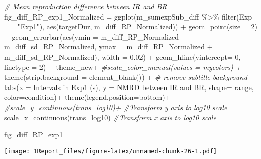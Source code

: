 \documentclass[
]{article}
\newenvironment{Shaded}{\begin{snugshade}}{\end{snugshade}}
\newcommand{\AttributeTok}[1]{\textcolor[rgb]{0.77,0.63,0.00}{#1}}
\newcommand{\CommentTok}[1]{\textcolor[rgb]{0.56,0.35,0.01}{\textit{#1}}}
\newcommand{\DecValTok}[1]{\textcolor[rgb]{0.00,0.00,0.81}{#1}}
\newcommand{\FloatTok}[1]{\textcolor[rgb]{0.00,0.00,0.81}{#1}}
\newcommand{\FunctionTok}[1]{\textcolor[rgb]{0.00,0.00,0.00}{#1}}
\newcommand{\NormalTok}[1]{#1}
\newcommand{\OtherTok}[1]{\textcolor[rgb]{0.56,0.35,0.01}{#1}}
\newcommand{\SpecialCharTok}[1]{\textcolor[rgb]{0.00,0.00,0.00}{#1}}
\newcommand{\StringTok}[1]{\textcolor[rgb]{0.31,0.60,0.02}{#1}}
\begin{document}
\begin{Shaded}
\begin{Highlighting}[]
\CommentTok{\# Mean reproduction difference between IR and BR}
\NormalTok{fig\_diff\_RP\_exp1\_Normalized }\OtherTok{=} \FunctionTok{ggplot}\NormalTok{(m\_sumexpSub\_diff }\SpecialCharTok{\%\textgreater{}\%} \FunctionTok{filter}\NormalTok{(Exp }\SpecialCharTok{==} \StringTok{"Exp1"}\NormalTok{), }\FunctionTok{aes}\NormalTok{(targetDur, m\_diff\_RP\_Normalized)) }\SpecialCharTok{+} 
  \FunctionTok{geom\_point}\NormalTok{(}\AttributeTok{size =} \DecValTok{2}\NormalTok{) }\SpecialCharTok{+}
  \FunctionTok{geom\_errorbar}\NormalTok{(}\FunctionTok{aes}\NormalTok{(}\AttributeTok{ymin =}\NormalTok{ m\_diff\_RP\_Normalized}\SpecialCharTok{{-}}\NormalTok{m\_diff\_sd\_RP\_Normalized, }\AttributeTok{ymax =}\NormalTok{ m\_diff\_RP\_Normalized }\SpecialCharTok{+}\NormalTok{ m\_diff\_sd\_RP\_Normalized), }\AttributeTok{width =} \FloatTok{0.02}\NormalTok{) }\SpecialCharTok{+} 
  \FunctionTok{geom\_hline}\NormalTok{(}\AttributeTok{yintercept=} \DecValTok{0}\NormalTok{, }\AttributeTok{linetype =} \DecValTok{2}\NormalTok{) }\SpecialCharTok{+}
\NormalTok{  theme\_new}\SpecialCharTok{+} \CommentTok{\#scale\_color\_manual(values = mycolors) +}
  \FunctionTok{theme}\NormalTok{(}\AttributeTok{strip.background =} \FunctionTok{element\_blank}\NormalTok{()) }\SpecialCharTok{+} \CommentTok{\# remove subtitle background}
  \FunctionTok{labs}\NormalTok{(}\AttributeTok{x =} \StringTok{\textquotesingle{}Intervals in Exp1 (s)\textquotesingle{}}\NormalTok{, }\AttributeTok{y =} \StringTok{\textquotesingle{}NMRD between IR and BR\textquotesingle{}}\NormalTok{, }\AttributeTok{shape=} \StringTok{\textquotesingle{}range\textquotesingle{}}\NormalTok{, }\AttributeTok{color=}\StringTok{\textquotesingle{}condition\textquotesingle{}}\NormalTok{)}\SpecialCharTok{+} 
  \FunctionTok{theme}\NormalTok{(}\AttributeTok{legend.position=}\StringTok{\textquotesingle{}bottom\textquotesingle{}}\NormalTok{)}\SpecialCharTok{+}
  \CommentTok{\#scale\_y\_continuous(trans=\textquotesingle{}log10\textquotesingle{})+ \#Transform y axis to log10 scale}
  \FunctionTok{scale\_x\_continuous}\NormalTok{(}\AttributeTok{trans=}\StringTok{\textquotesingle{}log10\textquotesingle{}}\NormalTok{) }\CommentTok{\#Transform x axis to log10 scale}

\NormalTok{fig\_diff\_RP\_exp1}
\end{Highlighting}
\end{Shaded}

\texttt{[image: 1Report\_files/figure-latex/unnamed-chunk-26-1.pdf]}
\end{document}
